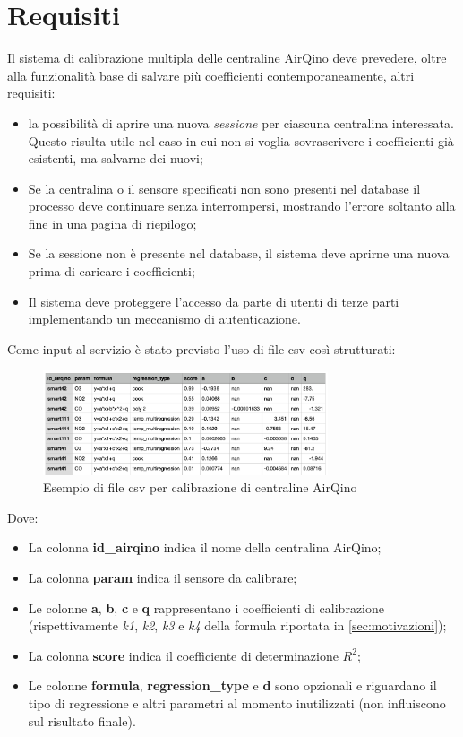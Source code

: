 \section{Requisiti}\label{sec:requisiti}
Il sistema di calibrazione multipla delle centraline AirQino deve prevedere, oltre alla funzionalità base di salvare più coefficienti contemporaneamente, altri requisiti:

\begin{itemize}
  \item la possibilità di aprire una nuova \textit{sessione} per ciascuna centralina interessata. Questo risulta utile nel caso in cui non si voglia sovrascrivere i coefficienti già esistenti, ma salvarne dei nuovi;
  \item Se la centralina o il sensore specificati non sono presenti nel database il processo deve continuare senza interrompersi, mostrando l'errore soltanto alla fine in una pagina di riepilogo;
  \item Se la sessione non è presente nel database, il sistema deve aprirne una nuova prima di caricare i coefficienti;
  \item Il sistema deve proteggere l'accesso da parte di utenti di terze parti implementando un meccanismo di autenticazione.
\end{itemize}

Come input al servizio è stato previsto l'uso di file csv così strutturati:

\begin{figure}[H]
\centering
\includegraphics[width=0.75\textwidth,height=\textheight,keepaspectratio]{img/csv_calib}
\caption{Esempio di file csv per calibrazione di centraline AirQino}
\label{fig:csv-calib}
\end{figure}

Dove: 

\begin{itemize}
  \item La colonna \textbf{id\_airqino} indica il nome della centralina AirQino;
  \item La colonna \textbf{param} indica il sensore da calibrare;
  \item Le colonne \textbf{a}, \textbf{b}, \textbf{c} e \textbf{q} rappresentano i coefficienti di calibrazione (rispettivamente \textit{k1}, \textit{k2}, \textit{k3} e \textit{k4} della formula riportata in \ref{sec:motivazioni});
  \item La colonna \textbf{score} indica il coefficiente di determinazione $R^2$;
  \item Le colonne \textbf{formula}, \textbf{regression\_type} e \textbf{d} sono opzionali e riguardano il tipo di regressione e altri parametri al momento inutilizzati (non influiscono sul risultato finale).
\end{itemize}

